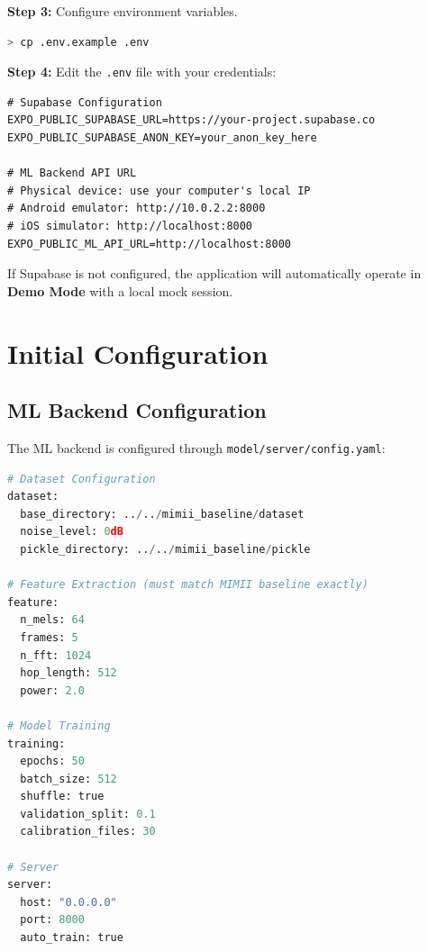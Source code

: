 \documentclass[10pt, a4paper, oneside]{report}
\begin{document}
\textbf{Step 3:} Configure environment variables.
\begin{lstlisting}[language=bash]
> cp .env.example .env
\end{lstlisting}

\textbf{Step 4:} Edit the \texttt{.env} file with your credentials:
\begin{lstlisting}[caption={Environment configuration (.env)}]
# Supabase Configuration
EXPO_PUBLIC_SUPABASE_URL=https://your-project.supabase.co
EXPO_PUBLIC_SUPABASE_ANON_KEY=your_anon_key_here

# ML Backend API URL
# Physical device: use your computer's local IP
# Android emulator: http://10.0.2.2:8000
# iOS simulator: http://localhost:8000
EXPO_PUBLIC_ML_API_URL=http://localhost:8000
\end{lstlisting}

\begin{infobox}
If Supabase is not configured, the application will automatically operate in \textbf{Demo Mode} with a local mock session.
\end{infobox}

\section{Initial Configuration}
\label{sec:config}

\subsection{ML Backend Configuration}
\label{subsec:config-backend}

The ML backend is configured through \texttt{model/server/config.yaml}:

\begin{lstlisting}[language=Python, caption={config.yaml --- ML Backend Configuration}]
# Dataset Configuration
dataset:
  base_directory: ../../mimii_baseline/dataset
  noise_level: 0dB
  pickle_directory: ../../mimii_baseline/pickle

# Feature Extraction (must match MIMII baseline exactly)
feature:
  n_mels: 64
  frames: 5
  n_fft: 1024
  hop_length: 512
  power: 2.0

# Model Training
training:
  epochs: 50
  batch_size: 512
  shuffle: true
  validation_split: 0.1
  calibration_files: 30

# Server
server:
  host: "0.0.0.0"
  port: 8000
  auto_train: true
\end{lstlisting}
\end{document}
